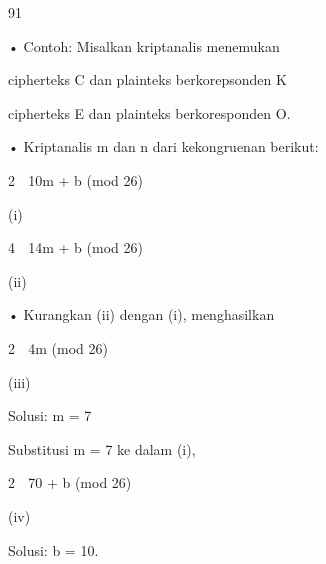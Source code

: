 \documentclass{article}
\begin{document}

91

• Contoh: Misalkan kriptanalis menemukan 



cipherteks C dan plainteks berkorepsonden K 



cipherteks E dan plainteks berkoresponden O. 

• Kriptanalis m dan n dari kekongruenan berikut:


2  10m + b (mod 26)  

(i)


4  14m + b (mod 26)  

(ii) 

• Kurangkan (ii) dengan (i), menghasilkan


2  4m (mod 26) 



(iii) 

  Solusi: m = 7

Substitusi m = 7  ke dalam (i),


2  70 + b (mod 26)  


(iv)


Solusi: b = 10.
\end{document}
